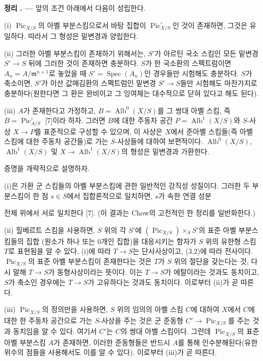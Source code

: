 \documentclass[11pt,twoside,openany]{book}
\numberwithin{equation}{section}
\newcommand{\sourceunit}{front}
\newcommand{\src}[1]{%
  \phantomsection\hypertarget{src:\sourceunit:#1}{}%
  \marginpar{\raggedleft\footnotesize\sffamily #1}%
}
\theoremstyle{plain}
\theoremstyle{definition}
\theoremstyle{remark}
\newcommand{\result}[2]{%
  \par\medskip\noindent\textbf{#1%
  \if\relax\detokenize{#2}\relax\else\space#2\fi. ---}\enspace
}
\begin{document}
\result{정리}{3.3} 앞의 조건 아래에서 다음이 성립한다.

\noindent(i) $\operatorname{Pic}_{X/S}$의 아벨 부분스킴으로서 바탕 집합이
$\operatorname{Pic}_{X/S}^\circ$인 것이 존재하면, 그것은 유일하다. 따라서
그 형성은 밑변경과 양립한다.

\noindent(ii) 그러한 아벨 부분스킴이 존재하기 위해서는, $S'$가 아르틴
국소 스킴인 모든 밑변경 $S'\longrightarrow S$ 뒤에 그러한 것이 존재하면
충분하다. $S$가 한 국소환의 스펙트럼이면
$A_n=A/\mathfrak m^{n+1}$로 놓았을 때
$S'=\operatorname{Spec}(A_n)$인 경우들만 시험해도 충분하다. $S$가
축소이면, $S'$가 이산 값매김환의 스펙트럼인 밑변경
$S'\longrightarrow S$들만 시험해도 마찬가지로 충분하다(원한다면 그 환은
완비이고 그 잉여체는 대수적으로 닫혀 있다고 해도 된다).

\noindent(iii) $A$가 존재한다고 가정하고,
$B=\operatorname{Alb}^0(X/S)$를 그 쌍대 아벨 스킴, 즉
$B=\operatorname{Pic}_{A/S}^\circ$ [7]이라 하자. 그러면 $B$에 대한
주동차 공간 $P=\operatorname{Alb}^1(X/S)$와 $S$-사상
$X\longrightarrow P$를 표준적으로 구성할 수 있으며, 이 사상은 $X$에서
준아벨 스킴들(즉 아벨 스킴에 대한 주동차 공간들)로 가는 $S$-사상들에
대하여 보편적이다. $\operatorname{Alb}^0(X/S)$,
$\operatorname{Alb}^1(X/S)$ 및
$X\longrightarrow\operatorname{Alb}^1(X/S)$의 형성은 밑변경과 가환한다.

증명을 개략적으로 설명하자.

(i)은 가환 군 스킴들의 아벨 부분스킴에 관한 일반적인 강직성 성질이다.
그러한 두 부분스킴이 한 점 $s\in S$에서 집합론적으로 일치하면, $s$가
속한 연결 성분

\src{238}
전체 위에서 서로 일치한다 [7]. (이 결과는 Chow의 고전적인 한 정리를
일반화한다.)

(ii) 힐베르트 스킴을 사용하면, $S$ 위의 각 $S'$에
$(\operatorname{Pic}_{X/S})\times_S S'$의 표준 아벨 부분스킴들의 집합
(원소가 하나 또는 0개인 집합)을 대응시키는 함자가 $S$ 위의 유한형 스킴
$T$로 표현됨을 알 수 있다. (i)에 따라 $T\longrightarrow S$는
단사사상이고, (3.2)에 따라 전사이다. $\operatorname{Pic}_{X/S}$의 표준
아벨 부분스킴이 존재한다는 것은 $T$가 $S$ 위의 절단을 갖는다는 것, 다시
말해 $T\longrightarrow S$가 동형사상이라는 뜻이다. 이는
$T\longrightarrow S$가 에탈이라는 것과도 동치이고, $S$가 축소인
경우에는 $T\longrightarrow S$가 고유하다는 것과도 동치이다. 이로부터
(ii)가 곧 따른다.

(iii) $\operatorname{Pic}_{X/S}$의 정의만을 사용하면, $S$ 위의 임의의
아벨 스킴 $C$에 대하여 $X$에서 $C$에 대한 한 주동차 공간으로 가는
$S$-사상을 주는 것은 군 준동형
$C'\longrightarrow\operatorname{Pic}_{X/S}$를 주는 것과 동치임을 알 수
있다. 여기서 $C'$는 $C$의 쌍대 아벨 스킴이다. 그런데
$\operatorname{Pic}_{X/S}$의 표준 아벨 부분스킴 $A$가 존재하면, 이러한
준동형들은 반드시 $A$를 통해 인수분해된다(유한 위수의 점들을 사용해서도
이를 알 수 있다). 이로부터 (iii)가 곧 따른다.
\end{document}
